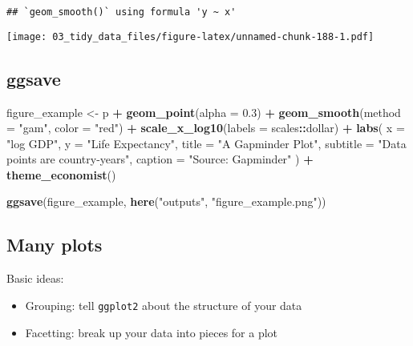 \documentclass[
]{book}
\newenvironment{Shaded}{\begin{snugshade}}{\end{snugshade}}
\newcommand{\DataTypeTok}[1]{\textcolor[rgb]{0.13,0.29,0.53}{#1}}
\newcommand{\FloatTok}[1]{\textcolor[rgb]{0.00,0.00,0.81}{#1}}
\newcommand{\KeywordTok}[1]{\textcolor[rgb]{0.13,0.29,0.53}{\textbf{#1}}}
\newcommand{\NormalTok}[1]{#1}
\newcommand{\OperatorTok}[1]{\textcolor[rgb]{0.81,0.36,0.00}{\textbf{#1}}}
\newcommand{\StringTok}[1]{\textcolor[rgb]{0.31,0.60,0.02}{#1}}
\providecommand{\tightlist}{%
  \setlength{\itemsep}{0pt}\setlength{\parskip}{0pt}}
\begin{document}
\begin{verbatim}
## `geom_smooth()` using formula 'y ~ x'
\end{verbatim}

\texttt{[image: 03\_tidy\_data\_files/figure-latex/unnamed-chunk-188-1.pdf]}

\hypertarget{ggsave}{%
\subsection{ggsave}\label{ggsave}}

\begin{Shaded}
\begin{Highlighting}[]
\NormalTok{figure\_example \textless{}{-}}\StringTok{ }\NormalTok{p }\OperatorTok{+}\StringTok{ }\KeywordTok{geom\_point}\NormalTok{(}\DataTypeTok{alpha =} \FloatTok{0.3}\NormalTok{) }\OperatorTok{+}
\StringTok{  }\KeywordTok{geom\_smooth}\NormalTok{(}\DataTypeTok{method =} \StringTok{"gam"}\NormalTok{, }\DataTypeTok{color =} \StringTok{"red"}\NormalTok{) }\OperatorTok{+}
\StringTok{  }\KeywordTok{scale\_x\_log10}\NormalTok{(}\DataTypeTok{labels =}\NormalTok{ scales}\OperatorTok{::}\NormalTok{dollar) }\OperatorTok{+}
\StringTok{  }\KeywordTok{labs}\NormalTok{(}
    \DataTypeTok{x =} \StringTok{"log GDP"}\NormalTok{,}
    \DataTypeTok{y =} \StringTok{"Life Expectancy"}\NormalTok{,}
    \DataTypeTok{title =} \StringTok{"A Gapminder Plot"}\NormalTok{,}
    \DataTypeTok{subtitle =} \StringTok{"Data points are country{-}years"}\NormalTok{,}
    \DataTypeTok{caption =} \StringTok{"Source: Gapminder"}
\NormalTok{  ) }\OperatorTok{+}
\StringTok{  }\KeywordTok{theme\_economist}\NormalTok{()}

\KeywordTok{ggsave}\NormalTok{(figure\_example, }\KeywordTok{here}\NormalTok{(}\StringTok{"outputs"}\NormalTok{, }\StringTok{"figure\_example.png"}\NormalTok{))}
\end{Highlighting}
\end{Shaded}

\hypertarget{many-plots}{%
\subsection{Many plots}\label{many-plots}}

Basic ideas:

\begin{itemize}
\tightlist
\item
  Grouping: tell \texttt{ggplot2} about the structure of your data
\item
  Facetting: break up your data into pieces for a plot
\end{itemize}
\end{document}
